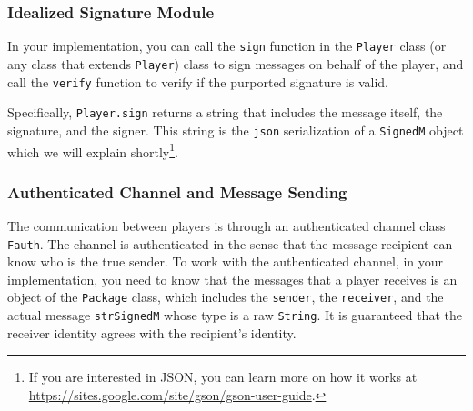 \subsubsection{Idealized Signature Module}

In your implementation, you can call the {\tt sign}
function in the {\tt Player} class (or any class that extends {\tt Player})
class to sign messages
on behalf of the player, and call
the {\tt verify}
function to verify if the purported signature is valid.

Specifically, {\tt Player.sign}
returns
a string that includes the message
itself, the signature,
and the signer.
This string is the {\tt json} serialization
of a {\tt SignedM} object
which we will explain shortly\footnote{If you are
    interested in JSON, you can learn more on how it works
    at \url{https://sites.google.com/site/gson/gson-user-guide}.
}.



\subsubsection{Authenticated Channel and Message Sending}

The communication between players is through an authenticated channel class
    {\tt Fauth}.
The channel is authenticated in the sense that the message
recipient can know who is the true sender.
To work with the authenticated channel, in your implementation, you
need to know that the messages that a player receives
is an object of the {\tt Package} class, which includes
the {\tt sender}, the {\tt receiver}, and the actual message {\tt strSignedM}
whose type is a raw {\tt String}.
It is guaranteed that the receiver identity agrees with the recipient's identity.

